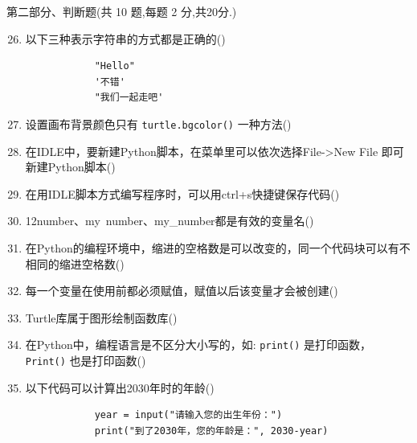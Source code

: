 \documentclass[11pt]{ctexart}
\begin{document}
    {\noindent\heiti 第二部分、判断题(共 10 题,每题 2 分,共20分.)}
    \begin{enumerate}
        \setcounter{enumi}{25}
        \item 以下三种表示字符串的方式都是正确的(\qquad)
        \begin{lstlisting}
            "Hello"
            '不错'
            "我们一起走吧'
        \end{lstlisting}

        \item 设置画布背景颜色只有 \lstinline!turtle.bgcolor()! 一种方法(\qquad)
        
        \item 在IDLE中，要新建Python脚本，在菜单里可以依次选择File->New File 即可新建Python脚本(\qquad)
  
        \item 在用IDLE脚本方式编写程序时，可以用ctrl+s快捷键保存代码(\qquad)
        
        \item 12number、my~number、my\_number都是有效的变量名(\qquad)
        
        \item 在Python的编程环境中，缩进的空格数是可以改变的，同一个代码块可以有不相同的缩进空格数(\qquad)
        
        \item 每一个变量在使用前都必须赋值，赋值以后该变量才会被创建(\qquad)
        
        \item  Turtle库属于图形绘制函数库(\qquad)
        
        \item 在Python中，编程语言是不区分大小写的，如: \lstinline{print()} 是打印函数，\lstinline{Print()} 也是打印函数(\qquad)
        
        \item 以下代码可以计算出2030年时的年龄(\qquad)
        \begin{lstlisting}
            year = input("请输入您的出生年份：")
            print("到了2030年，您的年龄是：", 2030-year)
        \end{lstlisting}
    \end{enumerate}
\end{document}
